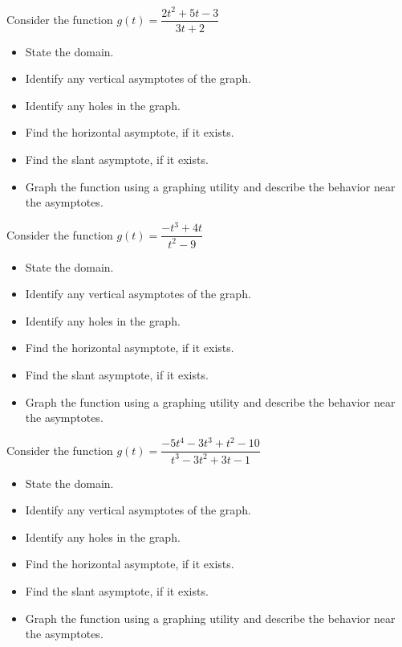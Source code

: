 \documentclass{ximera}
\begin{document}
\begin{problem}
Consider the function $g(t) = \dfrac{2t^{2} + 5t - 3}{3t + 2}$
\begin{itemize}
\item State the domain.
\item Identify any vertical asymptotes of the graph.
\item Identify any holes in the graph.
\item Find the horizontal asymptote, if it exists.
\item Find the slant asymptote, if it exists.
\item Graph the function using a graphing utility and describe the behavior near the asymptotes.
\end{itemize}
\end{problem} 

\begin{problem}
Consider the function $g(t) = \dfrac{-t^{3} + 4t}{t^{2} - 9}$
\begin{itemize}
\item State the domain.
\item Identify any vertical asymptotes of the graph.
\item Identify any holes in the graph.
\item Find the horizontal asymptote, if it exists.
\item Find the slant asymptote, if it exists.
\item Graph the function using a graphing utility and describe the behavior near the asymptotes.
\end{itemize}
\end{problem} 

\begin{problem}
Consider the function $g(t) = \dfrac{-5t^{4} - 3t^{3} + t^{2} - 10}{t^{3} - 3t^{2} + 3t - 1}$ 
\begin{itemize}
\item State the domain.
\item Identify any vertical asymptotes of the graph.
\item Identify any holes in the graph.
\item Find the horizontal asymptote, if it exists.
\item Find the slant asymptote, if it exists.
\item Graph the function using a graphing utility and describe the behavior near the asymptotes.
\end{itemize}
\end{problem}
\end{document}
